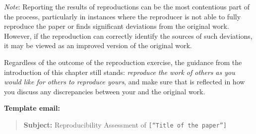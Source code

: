 \documentclass[
]{book}
\begin{document}
\emph{Note}: Reporting the results of reproductions can be the most contentious part of the process, particularly in instances where the reproducer is not able to fully reproduce the paper or finds significant deviations from the original work. However, if the reproduction can correctly identify the sources of such deviations, it may be viewed as an improved version of the original work.

Regardless of the outcome of the reproduction exercise, the guidance from the introduction of this chapter still stands: \emph{reproduce the work of others as you would like for others to reproduce yours}, and make sure that is reflected in how you discuss any discrepancies between your and the original work.

\textbf{Template email:}

\begin{quote}
\textbf{Subject:} Reproducibility Assessment of \texttt{{[}“Title\ of\ the\ paper”{]}}
\end{quote}
\end{document}
